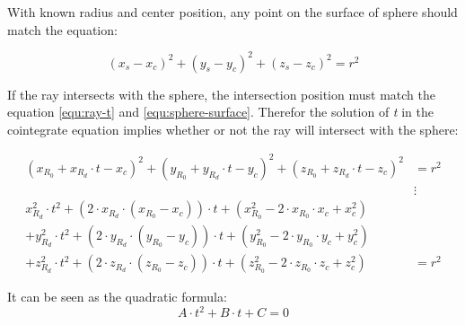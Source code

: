 With known radius and center position, any point on the surface of sphere should match the equation:

\begin{equation}\label{equ:sphere-surface}
(x_{s} - x_{c})^2 + (y_{s} - y_{c})^2 + (z_{s} - z_{c})^2 = r^2
\end{equation}

If the ray intersects with the sphere, the intersection position must match the equation  \ref{equ:ray-t} and \ref{equ:sphere-surface}. Therefor the solution of \emph{t} in the cointegrate equation implies whether or not the ray will intersect with the sphere:

\begin{equation}\label{equ:ray-sphere}
\begin{aligned}
(x_{R_{0}} + x_{R_{d}} \cdot t - x_{c})^2 + (y_{R_{0}} + y_{R_{d}} \cdot t - y_{c})^2 + (z_{R_{0}} + z_{R_{d}} \cdot t - z_{c})^2 &= r^2 \\
&\vdots \\
x_{R_{d}}^2 \cdot t^2 + (2 \cdot x_{R_{d}} \cdot (x_{R_{0}} - x_{c})) \cdot t + (x_{R_{0}}^2 - 2 \cdot x_{R_{0}}\cdot x_{c} + x_{c}^2) & \\
+ y_{R_{d}}^2 \cdot t^2 + (2 \cdot y_{R_{d}} \cdot (y_{R_{0}} - y_{c})) \cdot t + (y_{R_{0}}^2 - 2 \cdot y_{R_{0}}\cdot y_{c} + y_{c}^2) & \\
+ z_{R_{d}}^2 \cdot t^2 + (2 \cdot z_{R_{d}} \cdot (z_{R_{0}} - z_{c})) \cdot t + (z_{R_{0}}^2 - 2 \cdot z_{R_{0}}\cdot z_{c} + z_{c}^2) &= r^2
\end{aligned}
\end{equation}

It can be seen as the quadratic formula:
\begin{equation}\label{equ:sphere-surface-quadratic-formula}
A \cdot t^2 + B \cdot t + C = 0
\end{equation}






